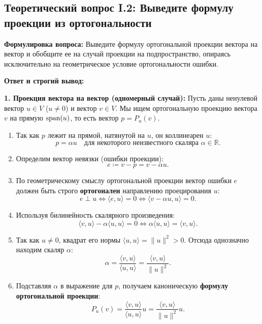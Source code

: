 
\subsection{Теоретический вопрос I.2: Выведите формулу проекции из ортогональности}
\textbf{Формулировка вопроса:} Выведите формулу ортогональной проекции вектора на вектор и обобщите ее на случай
проекции на подпространство, опираясь исключительно на геометрическое условие ортогональности ошибки.

\textbf{Ответ и строгий вывод:}

\textbf{1.
Проекция вектора на вектор (одномерный случай):} Пусть даны ненулевой вектор $u \in V$ ($u \ne 0$) и вектор $v \in V$.
Мы ищем ортогональную проекцию вектора $v$ на прямую $\operatorname{span}(u)$, то есть вектор $p = P_u(v)$.
\begin{enumerate}
    \item Так как $p$ лежит на прямой, натянутой на $u$, он коллинеарен $u$:
    \[ p = \alpha u \quad \text{для некоторого неизвестного скаляра } \alpha \in \mathbb{R}. \]
    \item Определим вектор невязки (ошибки проекции):
    \[ e \coloneqq v - p = v - \alpha u. \]
    \item По геометрическому смыслу ортогональной проекции вектор ошибки $e$ должен быть строго \textbf{ортогонален}
    направлению проецирования $u$:
    \[ e \perp u \iff \langle e, u \rangle = 0 \iff \langle v - \alpha u, u \rangle = 0. \]
    \item Используя билинейность скалярного произведения:
    \[ \langle v, u \rangle - \alpha \langle u, u \rangle = 0 \iff \alpha \langle u, u \rangle = \langle v,
    u \rangle.\]
    \item Так как $u \ne 0$, квадрат его нормы $\langle u, u \rangle = \|u\|^2 > 0$.
    Отсюда однозначно находим скаляр $\alpha$:
    \[ \alpha = \frac{\langle v, u \rangle}{\langle u, u \rangle} = \frac{\langle v, u \rangle}{\|u\|^2}. \]
    \item Подставляя $\alpha$ в выражение для $p$, получаем каноническую \textbf{формулу ортогональной проекции}:
    \[ P_u(v) = \frac{\langle v, u \rangle}{\langle u, u \rangle} u = \frac{\langle v, u \rangle}{\|u\|^2} u. \]
\end{enumerate}

